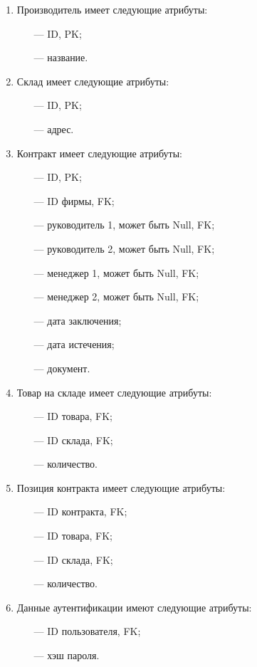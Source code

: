 \begin{enumerate}
		\item Производитель имеет следующие атрибуты: 
	\begin{itemize}
		\item[---] ID, PK;
		\item[---] название.
	\end{itemize}
	
	\item Склад имеет следующие атрибуты: 
	\begin{itemize}
		\item[---] ID, PK;
		\item[---] адрес.
	\end{itemize}
	
	\item Контракт имеет следующие атрибуты: 
	\begin{itemize}
		\item[---] ID, PK;
		\item[---] ID фирмы, FK;
		\item[---] руководитель 1, может быть Null, FK;
		\item[---] руководитель 2, может быть Null, FK;
		\item[---] менеджер 1, может быть Null, FK;
		\item[---] менеджер 2, может быть Null, FK;
		\item[---] дата заключения;
		\item[---] дата истечения;
		\item[---] документ.
	\end{itemize}

	\item Товар на складе имеет следующие атрибуты: 
	\begin{itemize}
		\item[---] ID товара, FK;
		\item[---] ID склада, FK;
		\item[---] количество. 
	\end{itemize}
	\newpage
	\item Позиция контракта имеет следующие атрибуты: 
	\begin{itemize}
		\item[---] ID контракта, FK;
		\item[---] ID товара, FK;
		\item[---] ID склада, FK;
		\item[---] количество. 
	\end{itemize}

	\item Данные аутентификации имеют следующие атрибуты: 
	\begin{itemize}
		\item[---] ID пользователя, FK;
		\item[---] хэш пароля. 
	\end{itemize}
\end{enumerate}

